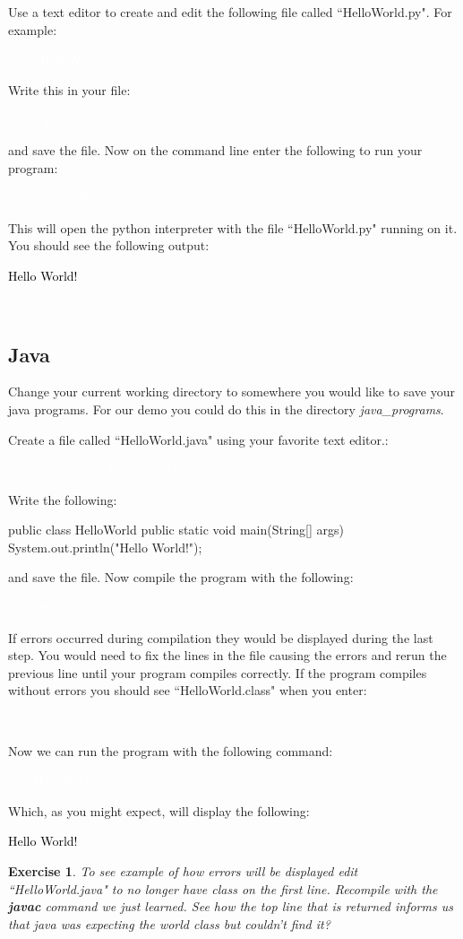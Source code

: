 \documentclass[oneside]{book}
\newcommand{\commandline}[1]{\begin{center} \colorbox{Dark}{\textcolor{white}{#1}} \end{center}}
\newcommand{\exampleout}[1]{\begin{center} \colorbox{Light}{\textcolor{black}{#1}} \end{center}}
\newtheorem{ex}{Exercise}[chapter]
\begin{document}
Use a text editor to create and edit the following file called ``HelloWorld.py". For example:
\commandline{atom HelloWorld.py}

Write this in your file:

\commandline{print("Hello World!")}
 and save the file. Now on the command line enter the following to run your program:
\commandline{python HelloWorld.py}
This will open the python interpreter with the file ``HelloWorld.py" running on it. You should see the following output:
\exampleout{Hello World!}\\

\subsection{Java}
Change your current working directory to somewhere you would like to save your java programs. For our demo you could do this in the directory \textit{java\_programs}.

Create a file called ``HelloWorld.java" using your favorite text editor.:

\commandline{[some text editor] HelloWorld.java}

Write the following:

\begin{verbatimtab}
    public class HelloWorld {
        public static void main(String[] args) {
            System.out.println("Hello World!");
        }
    }
\end{verbatimtab}
and save the file. Now compile the program with the following:
\commandline{javac HelloWorld.java}
If errors occurred during compilation they would be displayed during the last step. You would need to fix the lines in the file causing the errors and rerun the previous line until your program compiles correctly. If the program compiles without errors you should see ``HelloWorld.class" when you enter:
\commandline{ls}
Now we can run the program with the following command:
\commandline{java HelloWorld}
Which, as you might expect, will display the following:
\exampleout{Hello World!}

\vspace{0.5cm}

\begin{ex}
    To see example of how errors will be displayed edit ``HelloWorld.java" to no longer have class on the first line. Recompile with the \textbf{javac} command we just learned. See how the top line that is returned informs us that java was expecting the world class but couldn't find it?
\end{ex}
\end{document}
